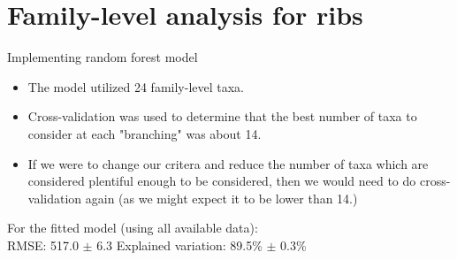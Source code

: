 \documentclass{beamer}
\begin{document}
\section[Ribs, family-level]{Family-level analysis for ribs}

\begin{frame}{Implementing random forest model}

\begin{itemize}
\item The model utilized 24 family-level taxa.
\item Cross-validation was used to determine that the best number of taxa to
consider at each "branching" was about 14.
\item If we were to change our critera and reduce the number of taxa which are
considered plentiful enough to be considered, then we would need to do
cross-validation again (as we might expect it to be lower than 14.)
\end{itemize}

\vspace{0.1in}

\noindent For the fitted model (using all available data):\\
\noindent RMSE: 517.0 $\pm$ 6.3  \hspace{0.05in}  Explained variation: 89.5\%
$\pm$ 0.3\%


\end{frame}
\end{document}

